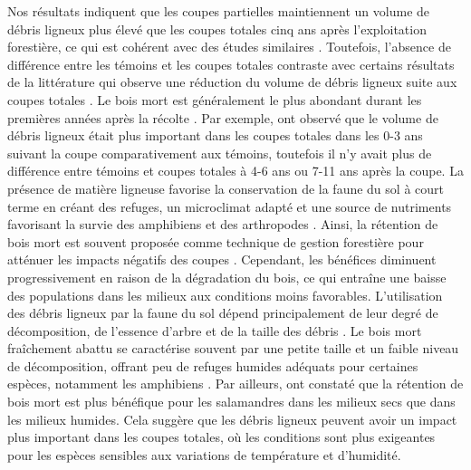 Nos résultats indiquent que les coupes partielles maintiennent un volume de débris ligneux plus élevé que les coupes totales cinq ans après l’exploitation forestière, ce qui est cohérent avec des études similaires \citep{Nolet2018Comparingeffects,Ochs2022Responseterrestrial}. 
Toutefois, l’absence de différence entre les témoins et les coupes totales contraste avec certains résultats de la littérature qui observe une réduction du volume de débris ligneux suite aux coupes totales \citep{Mazerolle2021Woodlandsalamander}.
Le bois mort est généralement le plus abondant durant les premières années après la récolte \citep{McCarthy1994Distributionabundance}. 
Par exemple, \cite{Ochs2022Responseterrestrial} ont observé que le volume de débris ligneux était plus important dans les coupes totales dans les 0-3 ans suivant la coupe comparativement aux témoins, 
toutefois il n’y avait plus de différence entre témoins et coupes totales à 4-6 ans ou 7-11 ans après la coupe. 
La présence de matière ligneuse favorise la conservation de la faune du sol à court terme en créant des refuges, un microclimat adapté et une source de nutriments favorisant la survie des amphibiens et des arthropodes \citep{Spotila1972Roletemperature,Huhta1976Effectsclearcutting,Seibold2021contributioninsects,Ochs2022Responseterrestrial}. 
Ainsi, la rétention de bois mort est souvent proposée comme technique de gestion forestière pour atténuer les impacts négatifs des coupes \citep{McKenny2006Effectsstructural}. 
Cependant, les bénéfices diminuent progressivement en raison de la dégradation du bois, ce qui entraîne une baisse des populations dans les milieux aux conditions moins favorables. 
L’utilisation des débris ligneux par la faune du sol dépend principalement de leur degré de décomposition, de l’essence d’arbre et de la taille des débris \citep{Bunnell2010woodbiodiversity}. 
Le bois mort fraîchement abattu se caractérise souvent par une petite taille et un faible niveau de décomposition, offrant peu de refuges humides adéquats pour certaines espèces, notamment les amphibiens \citep{Petranka1994Effectstimber,Morneault2004effectshelterwood,Owens2008Amphibianreptile,Otto2013Amphibianresponse}. 
Par ailleurs, \cite{Petranka1994Effectstimber} ont constaté que la rétention de bois mort est plus bénéfique pour les salamandres dans les milieux secs que dans les milieux humides. 
Cela suggère que les débris ligneux peuvent avoir un impact plus important dans les coupes totales, où les conditions sont plus exigeantes pour les espèces sensibles aux variations de température et d’humidité.

